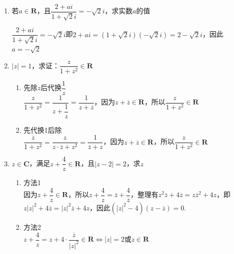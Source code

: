 \begin{enumerate}
    \item 若$a \in \mathbf{R}$，且$\dfrac{2+ai}{1+\sqrt{2}i} = -\sqrt{2}i$，求实数$a$的值
    \begin{jieda}
        $\dfrac{2+ai}{1+\sqrt{2}i} = -\sqrt{2}i$即$2+ai = (1+\sqrt{2}i)(-\sqrt{2}i) = 2-\sqrt{2}i$，因此$a = -\sqrt{2}$
    \end{jieda}
    \item $|z| = 1$，求证：$\dfrac{z}{1+z^2} \in \mathbf{R}$
    \begin{jieda}
        \begin{enumerate}
            \item 先除$z$后代换$\dfrac{1}{z}$ \\
            $\dfrac{z}{1+z^2} = \dfrac{1}{z + \dfrac{1}{z}} = \dfrac{1}{z + \overline{z}}$，因为$z + \overline{z} \in \mathbf{R}$，所以$\dfrac{z}{1+z^2} \in \mathbf{R}$
            \item 先代换1后除 \\
            $\dfrac{z}{1+z^2} = \dfrac{z}{z \cdot \overline{z} + z^2} = \dfrac{1}{\overline{z} + z}$，因为$z + \overline{z} \in \mathbf{R}$，所以$\dfrac{z}{1+z^2} \in \mathbf{R}$
        \end{enumerate}
    \end{jieda}
    \item $z \in \mathbf{C}$，满足$z + \dfrac{4}{z} \in \mathbf{R}$，且$|z-2| = 2$，求$z$
    \begin{jieda}
        \begin{enumerate}
            \item 方法1 \\
            因为$z + \dfrac{4}{z} \in \mathbf{R}$，所以$z + \dfrac{4}{z} = \overline{z} + \dfrac{4}{\overline{z}}$，整理有$z^2\overline{z} + 4\overline{z} = z\overline{z}^2 + 4z$，即$z|z|^2+4\overline{z} = |z|^2\overline{z} + 4z$，因此$(|z|^2-4)(z-\overline{z}) = 0$.
            \item 方法2 \\
            $z + \dfrac{4}{z} = z + 4 \cdot \dfrac{\overline{z}}{|z|^2} \in \mathbf{R} \Longleftrightarrow |z| = 2 \mbox{或} z \in \mathbf{R}$
        \end{enumerate}
\end{jieda}
\end{enumerate}
